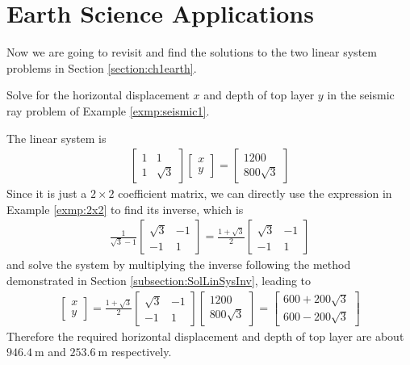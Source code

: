 \section{Earth Science Applications}
\label{section:ch3earth}
Now we are going to revisit and find the solutions to the two linear system problems in Section \ref{section:ch1earth}.
\begin{exmp}
Solve for the horizontal displacement $x$ and depth of top layer $y$ in the seismic ray problem of Example \ref{exmp:seismic1}.
\end{exmp}
\begin{solution}
The linear system is
\begin{align*}
\begin{bmatrix}
1 & 1 \\
1 & \sqrt{3}
\end{bmatrix}
\begin{bmatrix}
x \\
y
\end{bmatrix}
=
\begin{bmatrix}
1200 \\
800\sqrt{3}
\end{bmatrix}
\end{align*}
Since it is just a $2 \times 2$ coefficient matrix, we can directly use the expression in Example \ref{exmp:2x2} to find its inverse, which is
\begin{align*}
\frac{1}{\sqrt{3}-1}
\begin{bmatrix}
\sqrt{3} & -1 \\
-1 & 1
\end{bmatrix}
=
\frac{1+\sqrt{3}}{2}
\begin{bmatrix}
\sqrt{3} & -1 \\
-1 & 1
\end{bmatrix}
\end{align*}
and solve the system by multiplying the inverse following the method demonstrated in Section \ref{subsection:SolLinSysInv}, leading to
\begin{align*}
\begin{bmatrix}
x \\
y
\end{bmatrix}
=
\frac{1+\sqrt{3}}{2}
\begin{bmatrix}
\sqrt{3} & -1 \\
-1 & 1
\end{bmatrix}
\begin{bmatrix}
1200 \\
800\sqrt{3}
\end{bmatrix}
=
\begin{bmatrix}
600+200\sqrt{3}\\
600-200\sqrt{3}
\end{bmatrix}
\end{align*}
Therefore the required horizontal displacement and depth of top layer are about $\SI{946.4}{\m}$ and $\SI{253.6}{\m}$ respectively.
\end{solution}

